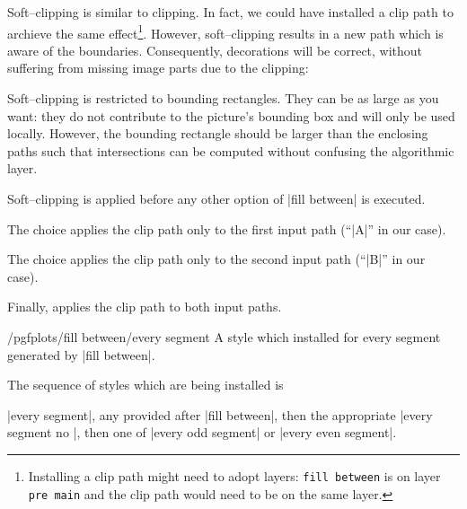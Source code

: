 \begin{pgfplotskeylist}
	Soft--clipping is similar to clipping. In fact, we could have installed a clip path to archieve the same effect\footnote{Installing a clip path might need to adopt layers: \texttt{fill between} is on layer \texttt{pre main} and the clip path would need to be on the same layer.}. However, soft--clipping results in a new path which is aware of the boundaries. Consequently, decorations will be correct, without suffering from missing image parts due to the clipping:
\begin{codeexample}[]
\end{codeexample}

	Soft--clipping is restricted to bounding rectangles. They can be as large as you want: they do not contribute to the picture's bounding box and will only be used locally. However, the bounding rectangle should be larger than the enclosing paths such that intersections can be computed without confusing the algorithmic layer.

	Soft--clipping is applied before any other option of |fill between| is executed.

	The choice  applies the clip path only to the first input path (``|A|'' in our case).

	The choice  applies the clip path only to the second input path (``|B|'' in our case).

	Finally,  applies the clip path to both input paths.

\end{pgfplotskeylist}

\begin{stylekey}{/pgfplots/fill between/every segment}
	A style which installed for every segment generated by |fill between|.

	The sequence of styles which are being installed is 

	|every segment|, any  provided after | fill between|, then the appropriate |every segment no |, then one of |every odd segment| or |every even segment|.
\end{stylekey}

